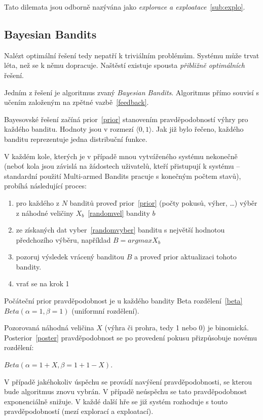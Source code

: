 \documentclass[thesis=M,czech]{FITthesis}[2014/05/07]
\begin{document}
Tato dilemata jsou odborně nazývána jako \emph{explorace a exploatace}~\ref{sub:explo}.	

\subsection{Bayesian Bandits}
\label{bayes}
Nalézt optimální řešení tedy nepatří k triviálním problémům. Systému může trvat léta, než se k němu dopracuje. Naštěstí existuje spousta \emph{přibližně optimálních} řešení.

Jedním z řešení je algoritmus zvaný \emph{Bayesian Bandits}. Algoritmus přímo souvisí s učením založeným na zpětné vazbě~\ref{feedback}.

Bayesovské řešení začíná prior~\ref{prior} stanovením pravděpodobností výhry pro každého banditu. Hodnoty jsou v rozmezí $\langle0,1\rangle$. Jak již bylo řečeno, každého banditu reprezentuje jedna distribuční funkce.

V každém kole, kterých je v případě mnou vytvářeného systému nekonečně (neboť kola jsou závislá na žádostech uživatelů, kteří přistupují k systému – standardní použití Multi-armed Bandits pracuje s konečným počtem stavů), probíhá následující proces:

\begin{enumerate}
	\item pro každého z $N$ banditů proveď prior~\ref{prior} (počty pokusů, výher, \ldots) výběr z náhodné veličiny $X_b$~\ref{randomvel} bandity $b$
	\item ze získaných dat vyber~\ref{randomvyber} banditu s největší hodnotou předchozího výběru, například $B = argmax X_b$	
	\item pozoruj výsledek vrácený banditou $B$ a proveď prior aktualizaci tohoto bandity.
	\item vrať se na krok 1
\end{enumerate}

Počáteční prior pravděpodobnost je u každého bandity Beta rozdělení~\ref{beta} ${Beta}(\alpha = 1, \beta = 1)$ (uniformní rozdělení).

Pozorovaná náhodná veličina $X$ (výhra či prohra, tedy 1 nebo 0) je binomická. Posterior~\ref{poster} pravděpodobnost se po provedení pokusu přizpůsobuje novému rozdělení:

\begin{center}
${Beta}(\alpha = 1 + X, \beta = 1 + 1 - X)$.
\end{center}

V případě jakéhokoliv úspěchu se provádí navýšení pravděpodobnosti, se kterou bude algoritmus znovu vybrán. V případě neúspěchu se tato pravděpodobnost exponenciálně snižuje. V každé další hře se již systém rozhoduje s touto pravděpodobností (mezí explorací a exploatací).
\end{document}
